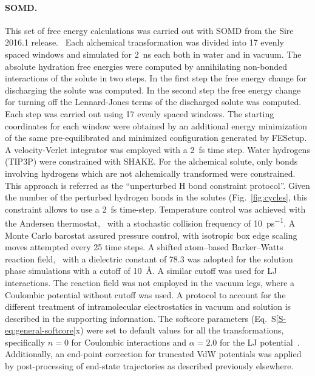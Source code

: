 \documentclass[journal=jctcce,manuscript=article]{achemso}
\begin{document}
\paragraph{SOMD.}
This set of free energy calculations was carried out with SOMD from the Sire 2016.1 release.~\cite{Sire-2016, doi:10.1021/ct300857j}
Each alchemical transformation was divided into 17 evenly spaced windows and simulated for \SI{2}{ns} each both in water and in vacuum. The absolute hydration free energies were computed by annihilating non-bonded interactions of the solute in two steps. In the first step the free energy change for discharging the solute was computed. In the second step the free energy change for turning off the Lennard-Jones terms of the discharged solute was computed. Each step was carried out using 17 evenly spaced windows.
The starting coordinates for each window were obtained by an additional energy minimization of the same pre-equilibrated and minimized configuration generated by FESetup.
A velocity-Verlet integrator was employed with a \SI{2}{fs} time step.
Water hydrogens (TIP3P) were constrained with SHAKE. For the alchemical solute, only bonds involving hydrogens which are not alchemically transformed were constrained. This approach is referred as the ``unperturbed H bond constraint protocol''. Given the number of the perturbed hydrogen bonds in the solutes (Fig.~\ref{fig:cycles}, this constraint allows to use a \SI{2}{fs} time-step.
Temperature control was achieved with the Andersen thermostat,~\cite{doi:10.1063/1.439486} with a stochastic collision frequency of \SI{10}{ps^{-1}}.
A Monte Carlo barostat assured pressure control, with isotropic box edge scaling moves attempted every 25 time steps.
A shifted atom--based Barker--Watts reaction field,~\cite{doi:10.1080/00268977300102101} with a dielectric constant of \num{78.3} was adopted for the solution phase simulations with a cutoff of \SI{10}{\angstrom}. A similar cutoff was used for LJ interactions.
The reaction field was not employed in the vacuum legs, where a Coulombic potential without cutoff was used.  A protocol to account for the different treatment of intramolecular electrostatics in vacuum and solution is described in the supporting information.
The softcore parameters (Eq.~S\ref{S-eq:general-softcore}x) were set to default values for all the transformations,
specifically $n = 0$ for Coulombic interactions and $\alpha = 2.0$ for the LJ potential~\cite{doi:10.1021/ct700081t}.
Additionally, an end-point correction for truncated VdW potentials was applied by post-processing of end-state trajectories as described previously elsewhere.~\cite{shirtsLRC,BosisioHG}
\end{document}
